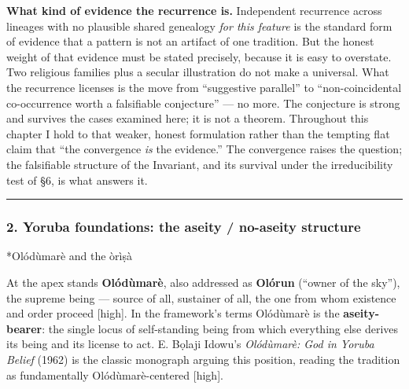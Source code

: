 \documentclass[11pt]{article}
\makeatletter
\renewcommand\paragraph{\@startsection{paragraph}{4}{\z@}{2ex plus 1ex}{0.4ex}{\normalfont\normalsize\bfseries}}
\makeatother
\begin{document}
\textbf{What kind of evidence the recurrence is.} Independent recurrence across lineages with no plausible shared genealogy \emph{for this feature} is the standard form of evidence that a pattern is not an artifact of one tradition. But the honest weight of that evidence must be stated precisely, because it is easy to overstate. Two religious families plus a secular illustration do not make a universal. What the recurrence licenses is the move from ``suggestive parallel'' to ``non-coincidental co-occurrence worth a falsifiable conjecture'' — no more. The conjecture is strong and survives the cases examined here; it is not a theorem. Throughout this chapter I hold to that weaker, honest formulation rather than the tempting flat claim that ``the convergence \emph{is} the evidence.'' The convergence raises the question; the falsifiable structure of the Invariant, and its survival under the irreducibility test of §6, is what answers it.

\medskip\noindent\rule{\linewidth}{0.3pt}\medskip

\subsubsection*{2. Yoruba foundations: the aseity /\allowbreak{} no-aseity structure}

\paragraph*{Olódùmarè and the òrìṣà}

At the apex stands \textbf{Olódùmarè}, also addressed as \textbf{Olórun} (``owner of the sky''), the supreme being — source of all, sustainer of all, the one from whom existence and order proceed [high]. In the framework's terms Olódùmarè is the \textbf{aseity-bearer}: the single locus of self-standing being from which everything else derives its being and its license to act. E. Bọlaji Idowu's \emph{Olódùmarè: God in Yoruba Belief} (1962) is the classic monograph arguing this position, reading the tradition as fundamentally Olódùmarè-centered [high].
\end{document}
